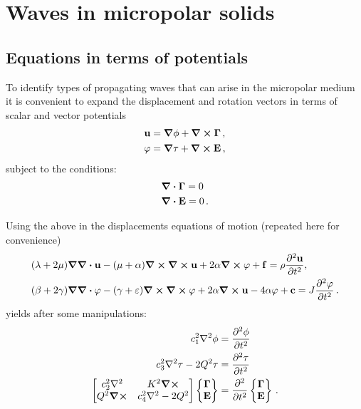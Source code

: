 \documentclass[12pt]{article}
\begin{document}
\section{Waves in micropolar solids}
\subsection{Equations in terms of potentials}

To identify types of propagating waves that can arise in the micropolar medium it is convenient to expand the displacement and rotation vectors in terms of scalar and vector potentials
\begin{align*}
\vb{u} &= \grad \phi + \curl\vb{\Gamma}\, ,\\
\vb{\varphi} &= \grad \tau + \curl\vb{E}\, ,
\end{align*}
subject to the conditions:
\begin{align*}
&\div\vb{\Gamma} = 0\\
&\div\vb{E} = 0\, .
\end{align*}

Using the above in the displacements equations of motion (repeated here for convenience)
\begin{subequations}\label{eq:disp_vector}
  \begin{align}
    & (\lambda + 2\mu) \grad\div\vb{u} - (\mu + \alpha)\curl\curl\vb{u} + 2\alpha \curl\vb{\varphi} + \vb{f} = \rho \pdv[2]{\vb{u}}{t}, \\
    & (\beta + 2\gamma) \grad\div\vb{\varphi} - (\gamma + \varepsilon) \curl\curl\vb{\varphi} +  2\alpha \curl\vb{u} - 4\alpha\vb{\varphi} + \vb{c} = J \pdv[2]{\vb{\varphi}}{t}\, .
  \end{align}
\end{subequations}
yields after some manipulations:
\begin{subequations}
  \begin{align}\label{eq:potential_waves}
    c_1^2 \laplacian\phi &= \pdv[2]{\phi}{t}\\
    c_3^2 \laplacian\tau - 2Q^2\tau &= \pdv[2]{\tau}{t}\\
    \begin{bmatrix}
      c_2^2\laplacian &K^2\curl\\
      Q^2\curl &c_4^2\laplacian - 2Q^2
    \end{bmatrix}
    \begin{Bmatrix} \vb{\Gamma}\\ \vb{E}\end{Bmatrix} &=
    \pdv[2]{t} \begin{Bmatrix} \vb{\Gamma}\\ \vb{E}\end{Bmatrix}\,.
  \end{align}
\end{subequations}
\end{document}
